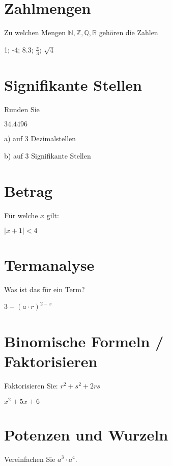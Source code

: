 


\usepackage{amssymb} %
\renewcommand{\metaHeaderLine}{Rückblick}
\renewcommand{\arbeitsblattTitel}{1. Jahr TALS}

\arbeitsblattHeader{}

\section{Zahlmengen}
Zu welchen Mengen $\mathbb{N}, \mathbb{Z}, \mathbb{Q}, \mathbb{R}$ gehören die Zahlen

1; -4; 8.3; $\frac{\pi}{3}$; $\sqrt{4}$

\section{Signifikante Stellen}
Runden Sie

$34.4496$

a) auf 3 Dezimalstellen 

b) auf 3 Signifikante Stellen 


\section{Betrag}
Für welche $x$ gilt:

$|x+1| < 4$


\section{Termanalyse}
Was ist das für ein Term?

$3 - (a\cdot{}r)^{2-x}$ 

\section{Binomische Formeln / Faktorisieren}
Faktorisieren Sie:
$r^2 + s^2 + 2rs$    

$x^2 + 5x + 6$ 


\section{Potenzen und Wurzeln}
Vereinfachen Sie $a^3 \cdot{} a^4$. 


